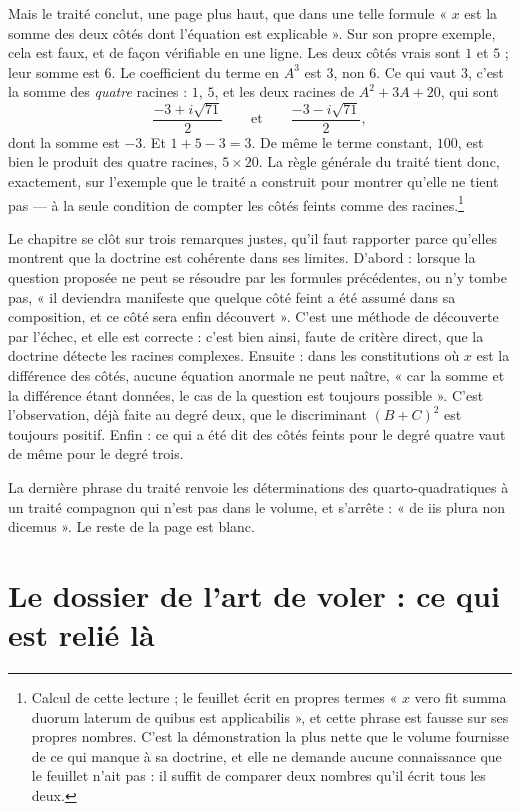 \documentclass[11pt,a4paper]{article}
\begin{document}
Mais le traité conclut, une page plus haut, que dans une telle formule « $x$ est
la somme des deux côtés dont l'équation est explicable ». Sur son propre exemple,
cela est faux, et de façon vérifiable en une ligne. Les deux côtés vrais sont
$1$ et $5$ ; leur somme est $6$. Le coefficient du terme en $A^3$ est $3$, non
$6$. Ce qui vaut $3$, c'est la somme des \emph{quatre} racines : $1$, $5$, et les
deux racines de $A^2 + 3A + 20$, qui sont
\[ \frac{-3 + i\sqrt{71}}{2} \qquad \text{et} \qquad \frac{-3 - i\sqrt{71}}{2}, \]
dont la somme est $-3$. Et $1 + 5 - 3 = 3$. De même le terme constant, $100$, est
bien le produit des quatre racines, $5 \times 20$. La règle générale du traité
tient donc, exactement, sur l'exemple que le traité a construit pour montrer
qu'elle ne tient pas — à la seule condition de compter les côtés feints comme
des racines.\footnote{Calcul de cette lecture ; le feuillet écrit en propres
termes « $x$ vero fit summa duorum laterum de quibus est applicabilis », et cette
phrase est fausse sur ses propres nombres. C'est la démonstration la plus nette
que le volume fournisse de ce qui manque à sa doctrine, et elle ne demande
aucune connaissance que le feuillet n'ait pas : il suffit de comparer deux
nombres qu'il écrit tous les deux.}

Le chapitre se clôt sur trois remarques justes, qu'il faut rapporter parce
qu'elles montrent que la doctrine est cohérente dans ses limites. D'abord :
lorsque la question proposée ne peut se résoudre par les formules précédentes,
ou n'y tombe pas, « il deviendra manifeste que quelque côté feint a été assumé
dans sa composition, et ce côté sera enfin découvert ». C'est une méthode de
découverte par l'échec, et elle est correcte : c'est bien ainsi, faute de
critère direct, que la doctrine détecte les racines complexes. Ensuite : dans
les constitutions où $x$ est la différence des côtés, aucune équation anormale ne
peut naître, « car la somme et la différence étant données, le cas de la
question est toujours possible ». C'est l'observation, déjà faite au degré deux,
que le discriminant $(B+C)^2$ est toujours positif. Enfin : ce qui a été dit des
côtés feints pour le degré quatre vaut de même pour le degré trois.

La dernière phrase du traité renvoie les déterminations des quarto-quadratiques
à un traité compagnon qui n'est pas dans le volume, et s'arrête : « de iis plura
non dicemus ». Le reste de la page est blanc.

\section*{Le dossier de l'art de voler : ce qui est relié là}
\end{document}
